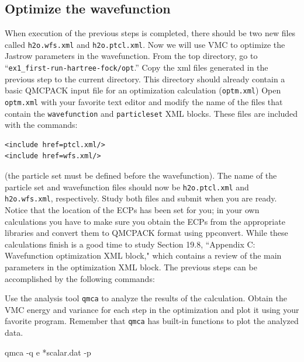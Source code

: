 \subsection{Optimize the wavefunction}
When execution of the previous steps is completed, there should be two new
files called \texttt{h2o.wfs.xml} and \texttt{h2o.ptcl.xml}. Now we will use VMC to optimize the 
Jastrow parameters in the wavefunction.  From the top directory, go to
``\texttt{ex1\_first-run-hartree-fock/opt}.'' Copy the xml files generated in the previous step
to the current directory. This directory should already contain a basic QMCPACK input
file for an optimization calculation (\texttt{optm.xml}) %
Open \texttt{optm.xml} with your favorite text editor and modify the name of the files that contain the
\texttt{wavefunction} and \texttt{particleset} XML blocks. These files are included with the commands:
\begin{lstlisting}[style=QMCPXML]
<include href=ptcl.xml/>
<include href=wfs.xml/>
\end{lstlisting}
(the particle set must be
defined before the wavefunction). The name of the particle set and wavefunction files should now be \texttt{h2o.ptcl.xml}
and \texttt{h2o.wfs.xml}, respectively. Study both files and submit when you are ready. Notice that the
location of the ECPs has been set for you; in your own calculations you have to make
sure you obtain the ECPs from the appropriate libraries and convert them to QMCPACK
format using ppconvert. While these calculations finish is a good time to study Section 19.8, ``Appendix C: Wavefunction optimization XML block," which contains a review
of the main parameters in the optimization XML block.  The
previous steps can be accomplished by the following commands:

Use the analysis tool \texttt{qmca} to analyze the results of the calculation. Obtain the VMC
energy and variance for each step in the optimization and plot it using your favorite program.
Remember that \texttt{qmca} has built-in functions to plot the analyzed data.
\begin{shade}
qmca -q e *scalar.dat -p
\end{shade}

